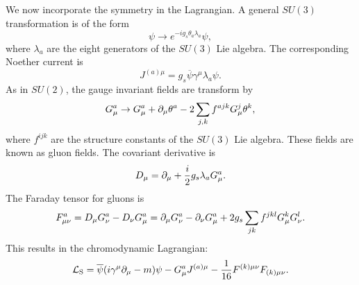 We now incorporate the symmetry in the Lagrangian. A general $SU(3)$ transformation is of the form
\begin{equation}
    \psi \rightarrow e^{-ig_s\theta_a\lambda_a} \psi,
\end{equation}
where $\lambda_a$ are the eight generators of the $SU(3)$ Lie algebra. The corresponding Noether current is
\begin{equation}
    J^{(a)\mu} = g_s \overline{\psi}\gamma^\mu\lambda_a \psi.
\end{equation}
As in $SU(2)$, the gauge invariant fields are transform by
\begin{equation}
    G_{\mu}^{a} \rightarrow G_{\mu}^{a} + \dcov \theta^a - 2 \sum_{j,k} f^{a jk}G_{\mu}^{j}\theta^{k},
\end{equation}
where $f^{ijk}$ are the structure constants of the $SU(3)$ Lie algebra. These fields are known as gluon fields. The covariant derivative is 
\begin{equation}
    D_\mu = \dcov +\frac{i}{2}g_s\lambda_{a}G_{\mu}^{a}.
\end{equation}
The Faraday tensor for gluons is
\begin{equation}
    F_{\mu\nu}^{a} = D_\mu G_\nu^a - D_\nu G_\mu ^a = \dcov G_\nu^a -\dcov[\nu] G_{\mu}^a +2g_s\sum_{jk}f^{jkl}G_{\mu}^{k}G_\nu^{l}.
\end{equation}
This results in the chromodynamic Lagrangian:
\begin{equation}
    \mathcal{L}_\text{S} = \overline{\psi}(i\gamma^\mu\dcov-m)\psi-G_\mu^{a}J^{(a)\mu}-\frac{1}{16}F^{(k)\mu\nu}F_{(k)\mu\nu}.
\end{equation}


